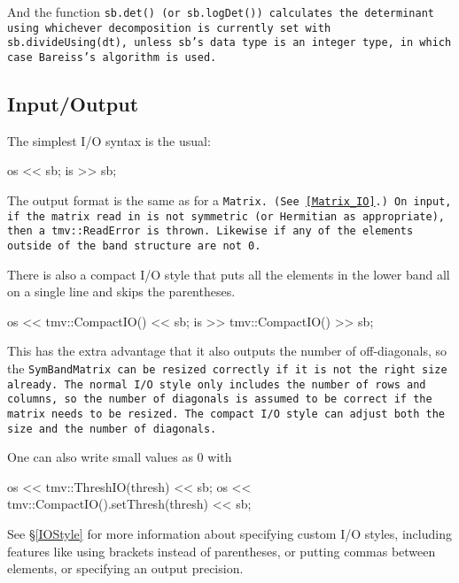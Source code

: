 And the function \tt{sb.det()} (or \tt{sb.logDet()}) calculates the determinant
using whichever decomposition is currently set with \tt{sb.divideUsing(dt)},
unless \tt{sb}'s data type is an integer type, in which case Bareiss's algorithm 
is used.

\subsection{Input/Output}
\label{SymBandMatrix_IO}

The simplest I/O syntax is the usual:
\begin{tmvcode}
os << sb;
is >> sb;
\end{tmvcode}
The output format is the same as for a \tt{Matrix}.
(See \ref{Matrix_IO}.)  On input, if the matrix read in is not symmetric (or Hermitian as appropriate), then a \tt{tmv::ReadError} is thrown.  Likewise if any of the elements outside of the band structure
are not 0.

There is also a compact I/O style that puts all the elements in the lower band all on a single line and skips the parentheses. 
\begin{tmvcode}
os << tmv::CompactIO() << sb;
is >> tmv::CompactIO() >> sb;
\end{tmvcode}
This has the extra advantage that it also outputs the number of off-diagonals, so the \tt{SymBandMatrix} can be resized correctly if it is not the right size already.  The normal I/O style only includes the number of rows and columns, so the number of diagonals is assumed to be correct if the matrix needs to be resized.  The compact I/O style can adjust both the size and the number of diagonals.

One can also write small values as 0 with
\begin{tmvcode}
os << tmv::ThreshIO(thresh) << sb;
os << tmv::CompactIO().setThresh(thresh) << sb;
\end{tmvcode}

See \S\ref{IOStyle} for more information about specifying custom I/O styles, including
features like using brackets instead of parentheses, or putting commas between elements,
or specifying an output precision.  

